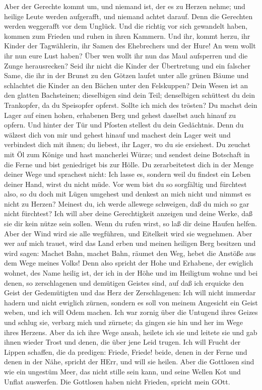  Aber der Gerechte kommt um, und niemand ist, der es zu
Herzen nehme; und heilige Leute werden aufgerafft, und niemand achtet
darauf. Denn die Gerechten werden weggerafft vor dem Unglück.
 Und die richtig vor sich gewandelt haben, kommen zum
Frieden und ruhen in ihren Kammern.  Und ihr, kommt herzu,
ihr Kinder der Tagwählerin, ihr Samen des Ehebrechers und der Hure!
 An wem wollt ihr nun eure Lust haben? Über wen wollt ihr
nun das Maul aufsperren und die Zunge herausrecken? Seid ihr nicht die
Kinder der Übertretung und ein falscher Same,  die ihr in
der Brunst zu den Götzen laufet unter alle grünen Bäume und schlachtet
die Kinder an den Bächen unter den Felskuppen?  Dein Wesen
ist an den glatten Bachsteinen; dieselbigen sind dein Teil; denselbigen
schüttest du dein Trankopfer, da du Speisopfer opferst. Sollte ich mich
des trösten?  Du machst dein Lager auf einen hohen,
erhabenen Berg und gehest daselbst auch hinauf zu opfern. 
Und hinter der Tür und Pfosten stellest du dein Gedächtnis. Denn du
wälzest dich von mir und gehest hinauf und machest dein Lager weit und
verbindest dich mit ihnen; du liebest, ihr Lager, wo du sie ersiehest.
 Du zeuchst mit Öl zum Könige und hast mancherlei Würze; und
sendest deine Botschaft in die Ferne und bist geniedriget bis zur Hölle.
 Du zerarbeitetest dich in der Menge deiner Wege und
sprachest nicht: Ich lasse es, sondern weil du findest ein Leben deiner
Hand, wirst du nicht müde.  Vor wem bist du so sorgfältig
und fürchtest also, so du doch mit Lügen umgehest und denkest an mich
nicht und nimmst es nicht zu Herzen? Meinest du, ich werde allewege
schweigen, daß du mich so gar nicht fürchtest?  Ich will
aber deine Gerechtigkeit anzeigen und deine Werke, daß sie dir kein
nütze sein sollen.  Wenn du rufen wirst, so laß dir deine
Haufen helfen. Aber der Wind wird sie alle wegführen, und Eitelkeit wird
sie wegnehmen. Aber wer auf mich trauet, wird das Land erben und meinen
heiligen Berg besitzen  und wird sagen: Machet Bahn, machet
Bahn, räumet den Weg, hebet die Anstöße aus dem Wege meines Volks!
 Denn also spricht der Hohe und Erhabene, der ewiglich
wohnet, des Name heilig ist, der ich in der Höhe und im Heiligtum wohne
und bei denen, so zerschlagenen und demütigen Geistes sind, auf daß ich
erquicke den Geist der Gedemütigten und das Herz der Zerschlagenen:
 Ich will nicht immerdar hadern und nicht ewiglich zürnen,
sondern es soll von meinem Angesicht ein Geist weben, und ich will Odem
machen.  Ich war zornig über die Untugend ihres Geizes und
schlug sie, verbarg mich und zürnete; da gingen sie hin und her im Wege
ihres Herzens.  Aber da ich ihre Wege ansah, heilete ich
sie und leitete sie und gab ihnen wieder Trost und denen, die über jene
Leid trugen.  Ich will Frucht der Lippen schaffen, die da
predigen: Friede, Friede! beide, denen in der Ferne und denen in der
Nähe, spricht der HErr, und will sie heilen.  Aber die
Gottlosen sind wie ein ungestüm Meer, das nicht stille sein kann, und
seine Wellen Kot und Unflat auswerfen.  Die Gottlosen haben
nicht Frieden, spricht mein GOtt.

